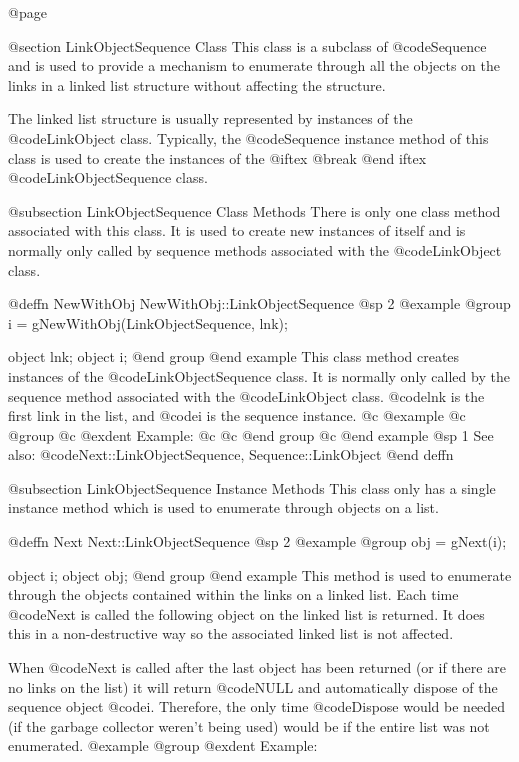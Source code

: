 @page

@section LinkObjectSequence Class
This class is a subclass of @code{Sequence} and is used to provide a
mechanism to enumerate through all the objects on the links in a linked
list structure without affecting the structure.

The linked list structure is usually represented by instances of the
@code{LinkObject} class.  Typically, the @code{Sequence} instance method
of this class is used to create the instances of the
@iftex 
@break 
@end iftex
@code{LinkObjectSequence} class.



@subsection LinkObjectSequence Class Methods
There is only one class method associated with this class.  It is used
to create new instances of itself and is normally only called by
sequence methods associated with the @code{LinkObject} class.





@deffn {NewWithObj} NewWithObj::LinkObjectSequence
@sp 2
@example
@group
i = gNewWithObj(LinkObjectSequence, lnk);

object  lnk;
object  i;
@end group
@end example
This class method creates instances of the @code{LinkObjectSequence}
class.  It is normally only called by the sequence method associated
with the @code{LinkObject} class.  @code{lnk} is the first link in the
list, and @code{i} is the sequence instance.
@c @example
@c @group
@c @exdent Example:
@c 
@c @end group
@c @end example
@sp 1
See also:  @code{Next::LinkObjectSequence, Sequence::LinkObject}
@end deffn




@subsection LinkObjectSequence Instance Methods
This class only has a single instance method which is used to enumerate
through objects on a list.






@deffn {Next} Next::LinkObjectSequence
@sp 2
@example
@group
obj = gNext(i);

object  i;
object  obj;
@end group
@end example
This method is used to enumerate through the objects contained within
the links on a linked list.  Each time @code{Next} is called the
following object on the linked list is returned.  It does this in a
non-destructive way so the associated linked list is not affected.

When @code{Next} is called after the last object has been returned (or
if there are no links on the list) it will return @code{NULL} and
automatically dispose of the sequence object @code{i}.  Therefore,
the only time @code{Dispose} would be needed (if the garbage collector
weren't being used) would be if the entire list was not enumerated.
@example
@group
@exdent Example:

